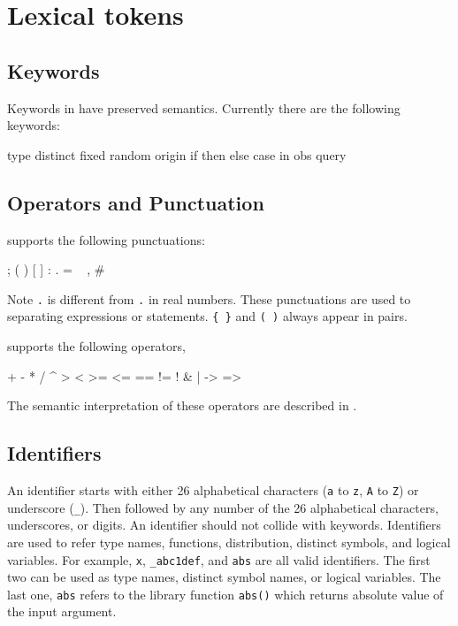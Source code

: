 \documentclass[12pt]{article}
\begin{document}
\section{Lexical tokens}
\subsection{Keywords} \label{keyword-section}
Keywords in \bl have preserved semantics. Currently there are the following keywords:
\begin{blogcode}
  type    distinct    fixed    random    origin
  if      then        else     case      in
  obs     query
\end{blogcode}

\subsection{Operators and Punctuation}
\bl supports the following punctuations:
\begin{blogcode}
  ;   {    }    (    )    [    ]
  :   .   =    ~    ,    #
\end{blogcode}
Note \verb|.| is different from \verb|.| in real numbers. 
These punctuations are used to separating expressions or statements. 
\verb|{ }| and \verb|( )| always appear in pairs. 

\bl supports the following operators,
\begin{blogcode}
  +    -    *    /    ^    %
  >    <    >=   <=   ==   !=
  !    &    |    ->   =>
\end{blogcode}
The semantic interpretation of these operators are described in .


\subsection{Identifiers}\label{identifier-section}
An identifier starts with either 26 alphabetical characters (\verb|a| to \verb|z|, \verb|A| to \verb|Z|) or underscore (\verb|_|). Then followed by any number of the 26 alphabetical characters, underscores, or digits. 
An identifier should not collide with keywords. 
Identifiers are used to refer type names, functions, distribution, distinct symbols, and logical variables. 
For example, \verb|x|, \verb|_abc1def|, and \verb|abs| are all valid identifiers. 
The first two can be used as type names, distinct symbol names, or logical variables. 
The last one, \verb|abs| refers to the library function \verb|abs()| which returns absolute value of the input argument.
\end{document}
